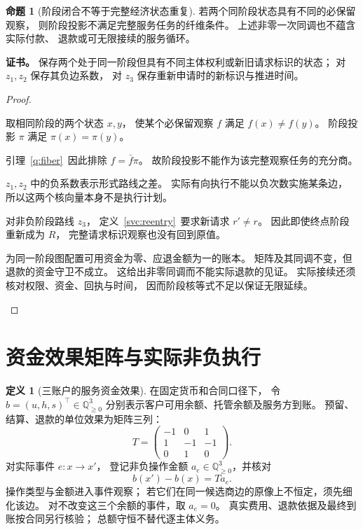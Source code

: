 \documentclass[UTF8,12pt,a4paper,openany,fontset=none,zihao=false]{ctexrep}
\theoremstyle{definition}
\newtheorem{definition}{定义}[chapter]
\newtheorem{proposition}{命题}[chapter]
\newenvironment{certificate}{\par\noindent\textbf{证书。}\ignorespaces}{\par}
\newcommand{\1}{\mathbf 1}
\begin{document}
\begin{proposition}[阶段闭合不等于完整经济状态重复]
\label{std:phase-boundary}
若两个同阶段状态具有不同的必保留观察，
则阶段投影不满足完整服务任务的纤维条件。
上述非零一次同调也不蕴含实际付款、
退款或可无限接续的服务循环。
\end{proposition}
\begin{certificate}
保存两个处于同一阶段但具有不同主体权利或新旧请求标识的状态；
对 \(z_1,z_2\) 保存其负边系数，
对 \(z_3\) 保存重新申请时的新标识与推进时间。
\end{certificate}
\begin{proof}
\begin{semanticsteps}
\item 取相同阶段的两个状态 \(x,y\)，
使某个必保留观察 \(f\) 满足 \(f(x)\ne f(y)\)。
阶段投影 \(\pi\) 满足 \(\pi(x)=\pi(y)\)。
\item 引理~\ref{q:fiber}~因此排除
\(f=\bar f\pi\)。
故阶段投影不能作为该完整观察任务的充分商。
\item \(z_1,z_2\) 中的负系数表示形式路线之差。
实际有向执行不能以负次数实施某条边，
所以这两个核向量本身不是执行计划。
\item 对非负阶段路线 \(z_3\)，
定义~\ref{svc:reentry}~要求新请求 \(r'\ne r\)。
因此即使终点阶段重新成为 \(R\)，
完整请求标识观察也没有回到原值。
\item 为同一阶段图配置可用资金为零、应退金额为一的账本。
矩阵及其同调不变，但退款的资金守卫不成立。
这给出非零同调而不能实际退款的见证。
实际接续还须核对权限、资金、回执与时间，
因而阶段核等式不足以保证无限延续。
\end{semanticsteps}
\end{proof}

\section{资金效果矩阵与实际非负执行}

\begin{definition}[三账户的服务资金效果]
\label{std:money}
在固定货币和合同口径下，
令 \(b=(u,h,s)^\top\in\mathbb Q_{\ge0}^3\)
分别表示客户可用余额、托管余额及服务方到账。
预留、结算、退款的单位效果为矩阵三列：
\[
T=
\begin{pmatrix}
-1&0&1\\
1&-1&-1\\
0&1&0
\end{pmatrix}.
\]
对实际事件 \(e:x\to x'\)，
登记非负操作金额 \(a_e\in\mathbb Q_{\ge0}^3\)，并核对
\[
b(x')-b(x)=Ta_e.
\]
操作类型与金额进入事件观察；
若它们在同一候选商边的原像上不恒定，须先细化该边。
对不改变这三个余额的事件，取 \(a_e=0\)。
真实费用、退款依据及最终到账按合同另行核验；
总额守恒不替代逐主体义务。
\end{definition}
\end{document}
